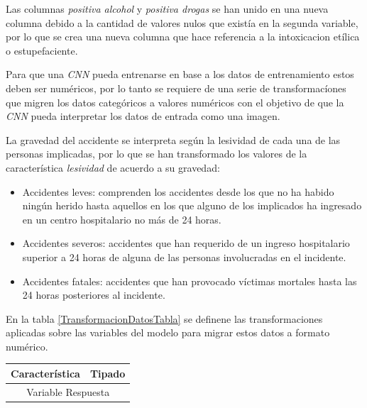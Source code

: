 \begin{enumerate}
\begin{enumerate}
                    Las columnas \textit{positiva alcohol} y \textit{positiva drogas} se han unido en una nueva columna debido a la cantidad de valores nulos que existía en la segunda variable, por lo que se crea una nueva columna que hace referencia a la intoxicacion etílica o estupefaciente.

                    Para que una \textit{CNN} pueda entrenarse en base a los datos de entrenamiento estos deben ser numéricos, por lo tanto se requiere de una serie de transformacíones que migren los datos categóricos a valores numéricos con el objetivo de que la \textit{CNN} pueda interpretar los datos de entrada como una imagen.

                    La gravedad del accidente se interpreta según la lesividad de cada una de las personas implicadas, por lo que se han transformado los valores de la característica \textit{lesividad} de acuerdo a su gravedad:

                    \begin{itemize}
                        \item Accidentes leves: comprenden los accidentes desde los que no ha habido ningún herido hasta aquellos en los que alguno de los implicados ha ingresado en un centro hospitalario no más de 24 horas.
                        \item Accidentes severos: accidentes que han requerido de un ingreso hospitalario superior a 24 horas de alguna de las personas involucradas en el incidente.
                        \item Accidentes fatales: accidentes que han provocado víctimas mortales hasta las 24 horas posteriores al incidente.
                    \end{itemize}

                    En la tabla \ref{TransformacionDatosTabla} se definene las transformaciones aplicadas sobre las variables del modelo para migrar estos datos a formato numérico.



                    \begin{table}[H]
                      \centering
                      \begin{tabular}{ll}
                           \toprule
                           \textbf{Característica} & \textbf{Tipado}\\
                           \midrule
                           \midrule
                           \multicolumn{2}{c}{Variable Respuesta}\\
                           \midrule


\end{tabular}
\end{table}
\end{enumerate}
\end{enumerate}
